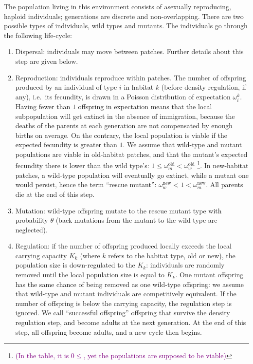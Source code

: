 \documentclass[11pt]{article}
\newcommand{\florence}[1]{\textcolor{purple}{(#1)}} %
\begin{document}
The population living in this environment consists of asexually reproducing, haploid individuals; generations are discrete and non-overlapping. There are two possible types of individuals, wild types and mutants. The individuals go through the following life-cycle: \begin{enumerate}[label = (\roman*)]
	\item Dispersal: individuals may move between patches. Further details about this step are given below.
	\item Reproduction: individuals reproduce within patches. The number of offspring produced by an individual of type $i$ in habitat $k$ (before density regulation, if any), i.e.\ its fecundity, is drawn in a Poisson distribution of expectation $\omega_i^k$. Having fewer than $1$ offspring in expectation means that the local subpopulation will get extinct in the absence of immigration, because the deaths of the parents at each generation are not compensated by enough births on average. On the contrary, the local population is viable if the expected fecundity is greater than $1$. We assume that wild-type and mutant populations are viable in old-habitat patches, and that the mutant's expected fecundity there is lower than the wild type's: $1 \leq \omega^{\text{old}}_m < \omega^{\text{old}}_w$ \footnote{\florence{In the table, it is $0 \leq $, yet the populations are supposed to be viable}}. In new-habitat patches, a wild-type population will eventually go extinct, while a mutant one would persist, hence the term ``rescue mutant'': $\omega^{\text{new}}_w < 1 < \omega^{\text{new}}_m$. 
	All parents die at the end of this step.
	\item {} Mutation: wild-type offspring mutate to the rescue mutant type with probability $\theta$ (back mutations from the mutant to the wild type are neglected).
	\item {}Regulation: if the number of offspring produced locally exceeds the local carrying capacity $K_k$ (where $k$ refers to the habitat type, old or new), the population size is down-regulated to the $K_k$: individuals are randomly removed until the local population size is equal to $K_k$. One mutant offspring has the same chance of being removed as one wild-type offspring:  we assume that wild-type and mutant individuals are competitively equivalent. If the number of offspring is below the carrying capacity, the regulation step is ignored. We call ``successful offspring'' offspring that survive the density regulation step, and become adults at the next generation. 
	At the end of this step, all offspring become adults, and a new cycle then begins.
\end{enumerate}
\end{document}
